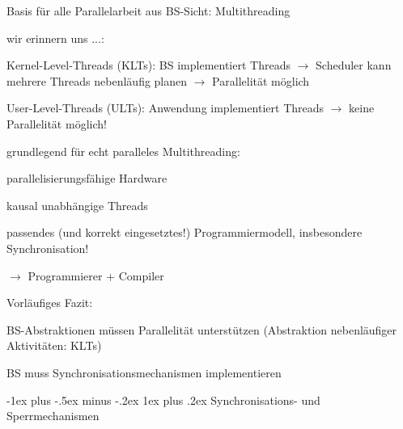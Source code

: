 \documentclass[a4paper]{article}
\makeatletter
\renewcommand{\subsubsection}{\@startsection{subsubsection}{3}{0mm}%
 {-1ex plus -.5ex minus -.2ex}%
 {1ex plus .2ex}%
 {\normalfont\small\bfseries}}
\makeatother
\begin{document}
\begin{multicols}{3}
    \begin{itemize*}
        \item
        Basis für alle Parallelarbeit aus BS-Sicht: Multithreading
        \item
        wir erinnern uns ...:
        \begin{itemize*}
            \item Kernel-Level-Threads (KLTs): BS implementiert Threads $\rightarrow$ Scheduler kann mehrere Threads nebenläufig planen $\rightarrow$ Parallelität möglich
            \item User-Level-Threads (ULTs): Anwendung implementiert Threads $\rightarrow$ keine Parallelität möglich!
        \end{itemize*}
        \item
        grundlegend für echt paralleles Multithreading:
        \begin{itemize*}
            \item parallelisierungsfähige Hardware
            \item kausal unabhängige Threads
            \item passendes (und korrekt eingesetztes!) Programmiermodell, insbesondere Synchronisation!
            \item $\rightarrow$ Programmierer + Compiler
        \end{itemize*}
    \end{itemize*}

    Vorläufiges Fazit:

    \begin{itemize*}
        \item
        BS-Abstraktionen müssen Parallelität unterstützen (Abstraktion
        nebenläufiger Aktivitäten: KLTs)
        \item
        BS muss Synchronisationsmechanismen implementieren
    \end{itemize*}


    \subsubsection{Synchronisations- und
        Sperrmechanismen}


\end{multicols}
\end{document}
